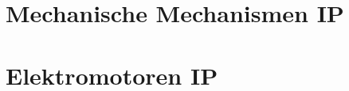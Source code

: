 \documentclass[numerate]{cheatsheet}
\begin{document}
%     
%     
%     
%     
%     
%     
%     
%     
%     

\section{Mechanische Mechanismen \hfill IP}
    
    
    
    
    
    
    
    
    
\section{Elektromotoren \hfill IP}
    
    
    
    

%     
%     
%     

%     
%     
%     
%     
\end{document}
